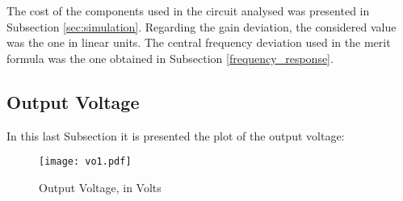 \par The cost of the components used in the circuit analysed was presented in Subsection \ref{sec:simulation}.
Regarding the gain deviation, the considered value was the one in linear units.
The central frequency deviation used in the merit formula was the one obtained in Subsection \ref{frequency_response}.

\subsection{Output Voltage}
\label{outv}
In this last Subsection it is presented the plot of the output voltage:
\begin{figure}[H] \centering
  \texttt{[image: vo1.pdf]}
  \caption{Output Voltage, in Volts}
  \label{fig:vo1}
\end{figure}
